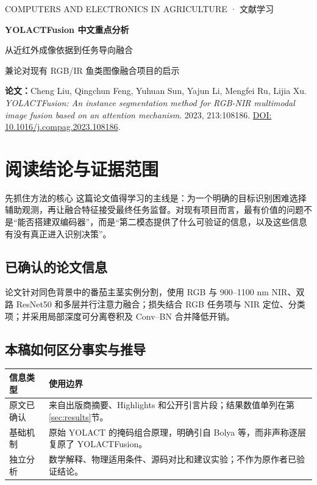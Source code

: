 \documentclass[UTF8,a4paper,11pt,fontset=windows]{ctexart}
\begin{document}
\begin{center}
  {\small\color{accent} COMPUTERS AND ELECTRONICS IN AGRICULTURE · 文献学习}\par
  \vspace{6mm}
  {\LARGE\bfseries\color{ink} YOLACTFusion 中文重点分析}\par
  \vspace{3mm}
  {\large 从近红外成像依据到任务导向融合}\par
  \vspace{2mm}
  {\normalsize 兼论对现有 RGB/IR 鱼类图像融合项目的启示}
\end{center}
\vspace{3mm}

\noindent\textbf{论文：}Cheng Liu, Qingchun Feng, Yuhuan Sun, Yajun Li, Mengfei Ru, Lijia Xu.
\emph{YOLACTFusion: An instance segmentation method for RGB-NIR multimodal image fusion based on an attention mechanism}.
2023, 213:108186. \href{https://doi.org/10.1016/j.compag.2023.108186}{DOI: 10.1016/j.compag.2023.108186}.

\section{阅读结论与证据范围}
\begin{note}{先抓住方法的核心}
这篇论文值得学习的主线是：为一个明确的目标识别困难选择辅助观测，再让融合特征接受最终任务监督。对现有项目而言，最有价值的问题不是“能否搭建双编码器”，而是“第二模态提供了什么可验证的信息，以及这些信息有没有真正进入识别决策”。
\end{note}

\subsection{已确认的论文信息}
论文针对同色背景中的番茄主茎实例分割，使用 RGB 与 900--1100 nm NIR、双路 ResNet50 和多层并行注意力融合；损失结合 RGB 任务项与 NIR 定位、分类项；并采用局部深度可分离卷积及 Conv--BN 合并降低开销\cite{liu2023}。

\subsection{本稿如何区分事实与推导}
\noindent\begin{tabularx}{\linewidth}{@{}L{2.3cm}Y@{}}
\toprule
信息类型 & 使用边界\\
\midrule
原文已确认 & 来自出版商摘要、Highlights 和公开引言片段；结果数值单列在第\ref{sec:results}节。\\
基础机制 & 原始 YOLACT 的掩码组合原理，明确引自 Bolya 等，而非声称逐层复原了 YOLACTFusion。\\
独立分析 & 数学解释、物理适用条件、源码对比和建议实验；不作为原作者已验证结论。\\
\bottomrule
\end{tabularx}
\end{document}
